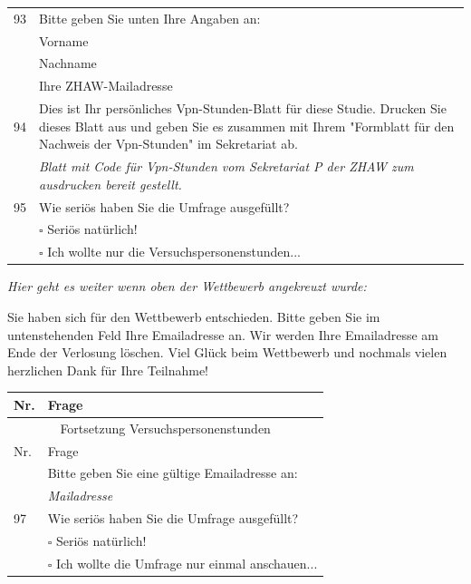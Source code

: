 \begin{flushleft}
\begin{longtable}[c]{ |p{1em}|p{35em}|}
  93 &Bitte geben Sie unten Ihre Angaben an:\\
  & Vorname\\
  & Nachname \\
  & Ihre ZHAW-Mailadresse\\
  
  94 & Dies ist Ihr persönliches Vpn-Stunden-Blatt für diese Studie. Drucken Sie dieses Blatt aus und geben Sie es zusammen mit Ihrem "Formblatt für den Nachweis der Vpn-Stunden" im Sekretariat ab.\\
  &\textit{Blatt mit Code für Vpn-Stunden vom Sekretariat P der ZHAW zum ausdrucken bereit gestellt.}\\
  
  95 & Wie seriös haben Sie die Umfrage ausgefüllt?\\
  &$\square$ Seriös natürlich!\\
  &$\square$ Ich wollte nur die Versuchspersonenstunden...\\
\end{longtable}

\textit{Hier geht es weiter wenn oben der Wettbewerb angekreuzt wurde:}

Sie haben sich für den Wettbewerb entschieden. Bitte geben Sie im untenstehenden Feld Ihre Emailadresse an. Wir werden Ihre Emailadresse am Ende der Verlosung löschen. Viel Glück beim Wettbewerb und nochmals vielen herzlichen Dank für Ihre Teilnahme!

\begin{longtable}[c]{ |p{1em}|p{35em}|} 
  \hline
  Nr. & \multicolumn{1}{|l|}{Frage} \\
  \hline
  \endfirsthead
 
  \hline
  \multicolumn{2}{|c|}{ Fortsetzung Versuchspersonenstunden}\\
  \hline
  Nr. & \multicolumn{1}{|l|}{Frage} \\
  \hline
  \endhead
 
  \hline
  \endfoot
 
  \hline\hline
  \endlastfoot
  96 & Bitte geben Sie eine gültige Emailadresse an:\\
  & \textit{Mailadresse}\\
  
  97 & Wie seriös haben Sie die Umfrage ausgefüllt?\\ 
  &$\square$ Seriös natürlich!\\
  &$\square$ Ich wollte die Umfrage nur einmal anschauen...\\
\end{longtable}

\end{flushleft}